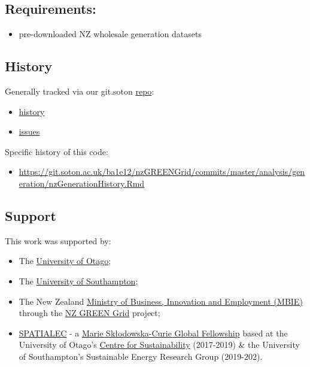 \documentclass[]{article}
\providecommand{\tightlist}{%
  \setlength{\itemsep}{0pt}\setlength{\parskip}{0pt}}
\theoremstyle{definition}
\theoremstyle{definition}
\theoremstyle{definition}
\theoremstyle{remark}
\begin{document}
\subsection{Requirements:}\label{requirements}

\begin{itemize}
\tightlist
\item
  pre-downloaded NZ wholesale generation datasets
\end{itemize}

\subsection{History}\label{history}

Generally tracked via our git.soton
\href{https://git.soton.ac.uk/ba1e12/nzGREENGrid}{repo}:

\begin{itemize}
\tightlist
\item
  \href{https://git.soton.ac.uk/ba1e12/nzGREENGrid/commits/master}{history}
\item
  \href{https://git.soton.ac.uk/ba1e12/nzGREENGrid/issues}{issues}
\end{itemize}

Specific history of this code:

\begin{itemize}
\tightlist
\item
  \url{https://git.soton.ac.uk/ba1e12/nzGREENGrid/commits/master/analysis/generation/nzGenerationHistory.Rmd}
\end{itemize}

\subsection{Support}\label{support}

This work was supported by:

\begin{itemize}
\tightlist
\item
  The \href{https://www.otago.ac.nz/}{University of Otago};
\item
  The \href{https://www.southampton.ac.uk/}{University of Southampton};
\item
  The New Zealand \href{http://www.mbie.govt.nz/}{Ministry of Business,
  Innovation and Employment (MBIE)} through the
  \href{https://www.otago.ac.nz/centre-sustainability/research/energy/otago050285.html}{NZ
  GREEN Grid} project;
\item
  \href{http://www.energy.soton.ac.uk/tag/spatialec/}{SPATIALEC} - a
  \href{http://ec.europa.eu/research/mariecurieactions/about-msca/actions/if/index_en.htm}{Marie
  Skłodowska-Curie Global Fellowship} based at the University of Otago's
  \href{http://www.otago.ac.nz/centre-sustainability/staff/otago673896.html}{Centre
  for Sustainability} (2017-2019) \& the University of Southampton's
  Sustainable Energy Research Group (2019-202).
\end{itemize}
\end{document}
